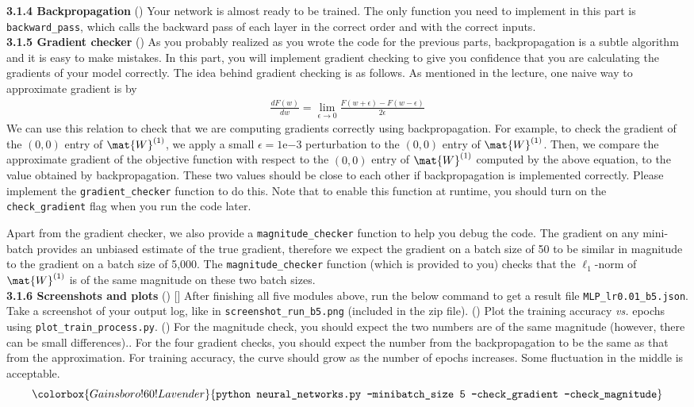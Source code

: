 \textbf{3.1.4 Backpropagation} () 
Your network is almost ready to be trained. The only function you need to implement in this part is \texttt{backward\_pass}, which calls the backward pass of each layer in the correct order and with the correct inputs.\\

\textbf{3.1.5 Gradient checker} () 
As you probably realized as you wrote the code for the previous parts, backpropagation is a subtle algorithm and it is easy to make mistakes. In this part, you will implement gradient checking to give you confidence that you are calculating the gradients of your model correctly. The idea behind gradient checking is as follows. As mentioned in the lecture, one naive way to approximate gradient is by
\begin{align*}
    \frac{dF(w)}{dw}=\lim_{\epsilon\rightarrow 0} \frac{F(w+\epsilon)-F(w-\epsilon)}{2\epsilon}
\end{align*}
We can use this relation to check that we are computing gradients correctly using backpropagation.
For example, to check the gradient of the $(0,0)$ entry of $\mat{W}^{(1)}$, we apply a small $\epsilon=1$e$-3$ perturbation to the $(0,0)$ entry of $\mat{W}^{(1)}$. Then, we compare the approximate gradient of the objective function with respect to the $(0,0)$ entry of $\mat{W}^{(1)}$ computed by the above equation, to the value obtained by backpropagation. These two values should be close to each other if backpropagation is implemented correctly. Please implement the \texttt{gradient\_checker} function to do this.
Note that to enable this function at runtime, you should turn on the \texttt{check\_gradient} flag when you run the code later.

Apart from the gradient checker, we also provide a \texttt{magnitude\_checker} function to help you debug the code. The gradient on any mini-batch provides an unbiased estimate of the true gradient, therefore we expect the gradient on a batch size of 50 to be similar in magnitude to the gradient on a batch size of 5,000. The \texttt{magnitude\_checker} function (which is provided to you) checks that the $\ell_1$-norm of $\mat{W}^{(1)}$ is of the same magnitude on these two batch sizes.\\

\textbf{3.1.6 Screenshots and plots} () []
After finishing all five modules above, run the below command to get a result file \texttt{MLP\_lr0.01\_b5.json}. Take a screenshot of your output log, like in \texttt{screenshot\_run\_b5.png} (included in the zip file). () Plot the training accuracy \textit{vs.} epochs using \texttt{plot\_train\_process.py}. () For the magnitude check, you should expect the two numbers are of the same magnitude (however, there can be small differences).. For the four gradient checks, you should expect the number from the backpropagation to be the same as that from the approximation. For training accuracy, the curve should grow as the number of epochs increases. Some fluctuation in the middle is acceptable.
$$\colorbox{Gainsboro!60!Lavender}{\texttt{python neural\_networks.py --minibatch\_size 5 --check\_gradient --check\_magnitude}}$$

